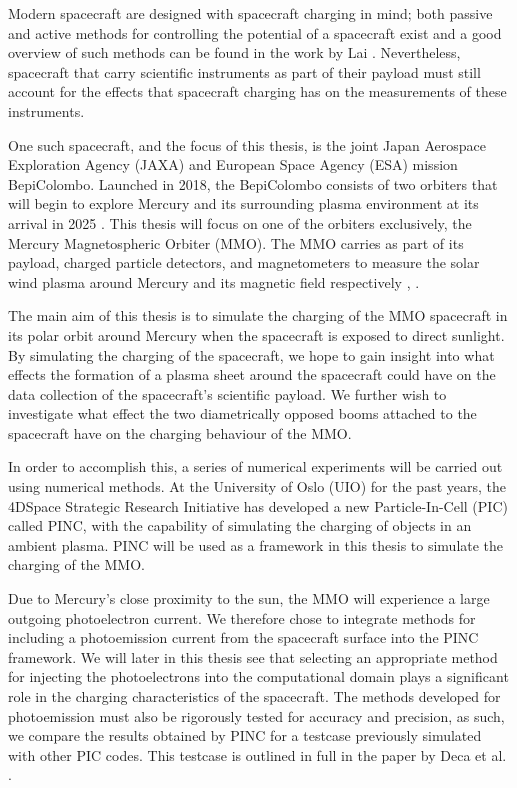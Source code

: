 Modern spacecraft are designed with spacecraft charging in mind; both passive and active methods for controlling the potential of a spacecraft exist and a good overview of such methods can be found in the work by Lai \parencite{Lai2003}. Nevertheless, spacecraft that carry scientific instruments as part of their payload must still account for the effects that spacecraft charging has on the measurements of these instruments. 

One such spacecraft, and the focus of this thesis, is the joint Japan Aerospace Exploration Agency (JAXA) and European Space Agency (ESA) mission BepiColombo. Launched in 2018, the BepiColombo consists of two orbiters that will begin to explore Mercury and its surrounding plasma environment at its arrival in 2025 \parencite{Benkhoff2009}. This thesis will focus on one of the orbiters exclusively, the Mercury Magnetospheric Orbiter (MMO). The MMO carries as part of its payload, charged particle detectors, and magnetometers to measure the solar wind plasma around Mercury and its magnetic field respectively \parencite{Saito2010}, \parencite{Benkhoff2009}. 

The main aim of this thesis is to simulate the charging of the MMO spacecraft in its polar orbit around Mercury when the spacecraft is exposed to direct sunlight. By simulating the charging of the spacecraft, we hope to gain insight into what effects the formation of a plasma sheet around the spacecraft could have on the data collection of the spacecraft's scientific payload. We further wish to investigate what effect the two diametrically opposed booms attached to the spacecraft have on the charging behaviour of the MMO.  

In order to accomplish this, a series of numerical experiments will be carried out using numerical methods. At the University of Oslo (UIO) for the past years, the 4DSpace Strategic Research Initiative has developed a new Particle-In-Cell (PIC) called PINC, with the capability of simulating the charging of objects in an ambient plasma. PINC will be used as a framework in this thesis to simulate the charging of the MMO.

Due to Mercury's close proximity to the sun, the MMO will experience a large outgoing photoelectron current. We therefore chose to integrate methods for including a photoemission current from the spacecraft surface into the PINC framework. We will later in this thesis see that selecting an appropriate method for injecting the photoelectrons into the computational domain plays a significant role in the charging characteristics of the spacecraft. The methods developed for photoemission must also be rigorously tested for accuracy and precision, as such, we compare the results obtained by PINC for a testcase previously simulated with other PIC codes. This testcase is outlined in full in the paper by Deca et al. \parencite{Deca2013}.

